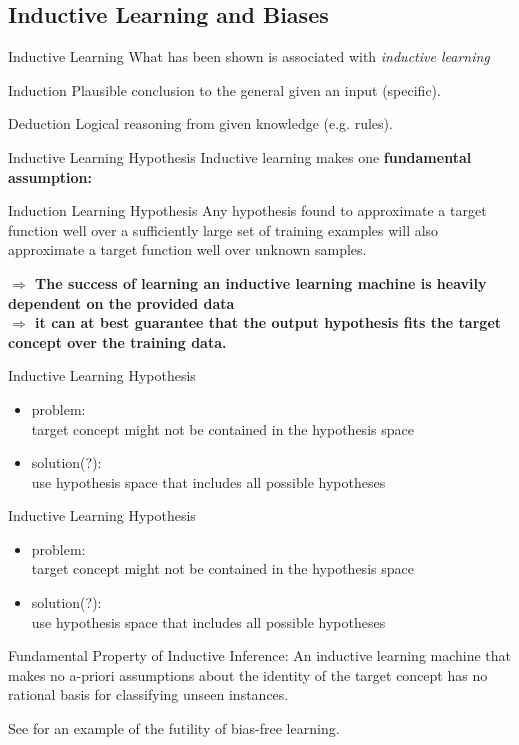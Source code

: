 \documentclass{beamer}
\begin{document}
\subsection{Inductive Learning and Biases}


\begin{frame}{Inductive Learning}
What has been shown is associated with \emph{inductive learning}
\begin{block}{Induction}
Plausible conclusion to the general given an input (specific).
\end{block}
\begin{block}{Deduction}
Logical reasoning from given knowledge (e.g. rules).
\end{block}
\end{frame}


\begin{frame}{Inductive Learning Hypothesis}
Inductive learning makes one \textbf{fundamental assumption:}
\begin{block}{Induction Learning Hypothesis}
Any hypothesis found to approximate a target function well over a sufficiently large set of training examples will also approximate a target function well over unknown samples.
\end{block}
\textbf{$\Rightarrow$ The success of learning an inductive learning machine is heavily dependent on the provided data}
\\\textbf{$\Rightarrow$ it can at best guarantee that the output hypothesis fits the target concept over the training data.}
\end{frame}

\begin{frame}{Inductive Learning Hypothesis}
\begin{itemize}
\item problem: \\target concept might not be contained in the hypothesis space
\item solution(?):\\use hypothesis space that includes all possible hypotheses
\end{itemize}
\end{frame}


\begin{frame}{Inductive Learning Hypothesis}
\begin{itemize}
\item problem: \\target concept might not be contained in the hypothesis space
\item solution(?):\\use hypothesis space that includes all possible hypotheses
\end{itemize}
\begin{block}{Fundamental Property of Inductive Inference:}
An inductive learning machine that makes no a-priori assumptions about the identity of the target concept has no rational basis for classifying unseen instances.
\end{block}
See \cite{mitchell1997a} for an example of the futility of bias-free learning.
\end{frame}
\end{document}
